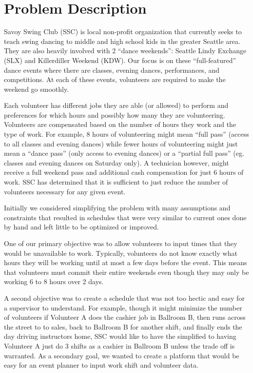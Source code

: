 \documentclass[11pt]{article}
\theoremstyle{definition}
\begin{document}
\section{Problem Description}
\begin{multicols}{2}
Savoy Swing Club (SSC) is local non-profit organization that currently seeks to teach swing dancing to middle and high school kids in the greater Seattle area.
They are also heavily involved with 2 “dance weekends”: Seattle Lindy Exchange (SLX) and Killerdiller Weekend (KDW). Our focus is on these ``full-featured'' dance events where there are classes, evening dances, performances, and competitions.
At each of these events, volunteers are required to make the weekend go smoothly.

Each volunteer has different jobs they are able (or allowed) to perform and preferences for which hours and possibly how many they are volunteering.
Volunteers are compensated based on the number of hours they work and the type of work.
For example, 8 hours of volunteering might mean “full pass” (access to all classes and evening dances) while fewer hours of volunteering might just mean a “dance pass” (only access to evening dances) or a “partial full pass” (eg. classes and evening dances on Saturday only).
A technician however, might receive a full weekend pass and additional cash compensation for just 6 hours of work.
SSC has determined that it is sufficient to just reduce the number of volunteers necessary for any given event.

Initially we considered simplifying the problem with many assumptions and constraints that resulted in schedules that were very similar to current ones done by hand and left little to be optimized or improved.

One of our primary objective was to allow volunteers to input times that they would be unavailable to work.
Typically, volunteers do not know exactly what hours they will be working until at most a few days before the event.
This means that volunteers must commit their entire weekends even though they may only be working 6 to 8 hours over 2 days.

A second objective was to create a schedule that was not too hectic and easy for a supervisor to understand.
For example, though it might minimize the number of volunteers if Volunteer A does the cashier job in Ballroom B, then runs across the street to to sales, back to Ballroom B for another shift, and finally ends the day driving instructors home, SSC would like to have the simplified to having Volunteer A just do 3 shifts as a cashier in Ballroom B unless the trade off is warranted.
As a secondary goal, we wanted to create a platform that would be easy for an event planner to input work shift and volunteer data.


\end{multicols}
\end{document}
